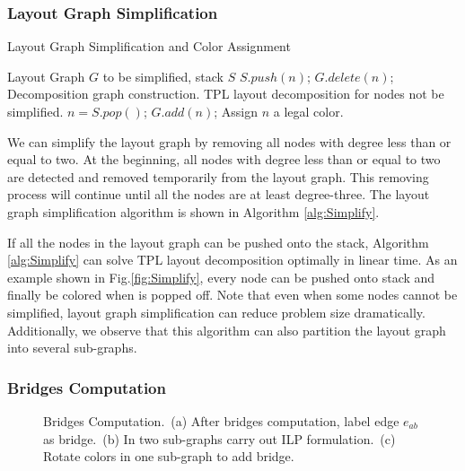 \documentclass[10pt,conference]{IEEEtran}
\begin{document}
\subsubsection{Layout Graph Simplification}
\label{sec:Simplification}

\begin{algorithm}[htb]
\caption{Layout Graph Simplification and Color Assignment} 
\label{alg:Simplify}
\begin{algorithmic}[1]
   \REQUIRE Layout Graph $G$ to be simplified, stack $S$
         \STATE $S.push(n)$;
         \STATE $G.delete(n)$;
   \ENDWHILE
   \STATE Decomposition graph construction.
   \STATE TPL layout decomposition for nodes not be simplified.
   	\STATE $n = S.pop()$;
	\STATE $G.add(n)$;
	\STATE Assign $n$ a legal color.
   \ENDWHILE
\end{algorithmic}
\end{algorithm}


We can simplify the layout graph by removing all nodes with degree less than or equal to two.
At the beginning, all nodes with degree less than or equal to two are detected and removed temporarily from the layout graph.
This removing process will continue until all the nodes are at least degree-three.
The layout graph simplification algorithm is shown in Algorithm \ref{alg:Simplify}.


If all the nodes in the layout graph can be pushed onto the stack, Algorithm \ref{alg:Simplify} can solve TPL layout decomposition optimally in linear time. 
As an example shown in Fig.\ref{fig:Simplify}, every node can be pushed onto stack and finally be colored when is popped off.
Note that even when some nodes cannot be simplified, layout graph simplification can reduce problem size dramatically. 
Additionally, we observe that this algorithm can also partition the layout graph into several sub-graphs.




\subsubsection{Bridges Computation}

\begin{figure}[tb]
	\centering
\vspace{0.2em}
	\vspace{0.2em}
\caption{Bridges Computation.~(a) After bridges computation, label edge $e_{ab}$ as bridge.~(b) In two sub-graphs carry out ILP formulation.~(c) Rotate colors in one sub-graph to add bridge.
	}
	\label{fig:bridge}
\end{figure}
\end{document}
